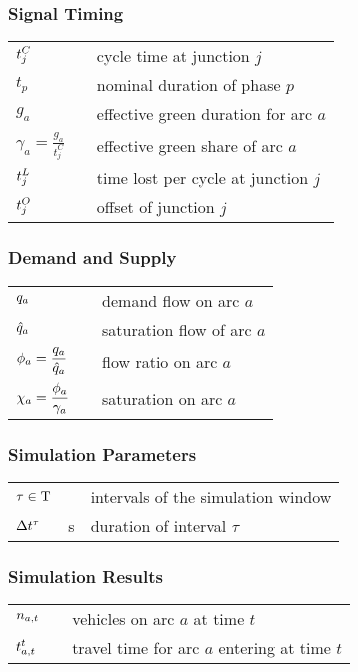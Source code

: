 \subsubsection*{Signal Timing}
\begin{tabu} to \textwidth {X[3,c] X[1,c] X[6,l]}
$ t_{j}^C $ &  & cycle time at junction $j$\\[2pt]
$ t_p   $ &  & nominal duration of phase $p$\\[2pt]
$ g_a   $ &  & effective green duration for arc $a$\\[3pt]
$ \displaystyle \gamma_a = \frac{g_a}{t_j^C} $ & \units{\%} & effective green share of arc $a$\\[2pt]
$ t_{j}^L $ &  & time lost per cycle at junction $j$\\[2pt]
$ t_{j}^O $ &  & offset of junction $j$ \\[2pt]
\end{tabu} 


\subsubsection*{Demand and Supply}
\begin{tabu} to \textwidth {X[3,c] X[1,c] X[6,l]}
$ q_{a} $ &  & demand flow on arc $a$ \\[2pt]
$ \hat{q}_a $ &  & saturation flow of arc $a$ \\[2pt]

$ \displaystyle \phi_a = \frac{q_a}{\hat{q}_a} $ & & flow ratio on arc $a$ \\[2pt]
$ \displaystyle \chi_a = \frac{\phi_a}{\gamma_a} $ & & saturation on arc $a$ \\[2pt]
\end{tabu} 

\subsubsection*{Simulation Parameters}
\begin{tabu} to \textwidth {X[3,c] X[1,c] X[6,l]}
$ \tau \in \mathrm{T} $ &  & intervals of the simulation window \\[2pt]
$ \Delta t^{\tau} $ & s & duration of interval $\tau$\\[2pt]
\end{tabu}

\subsubsection*{Simulation Results}
\begin{tabu} to \textwidth {X[3,c] X[1,c] X[6,l]}
$ n_{a,t} $ &  & vehicles on arc $a$ at time $t$\\[2pt]
$ t_{a,t}^t $ &  & travel time for arc $a$ entering at time $t$ \\[2pt]
\end{tabu}


